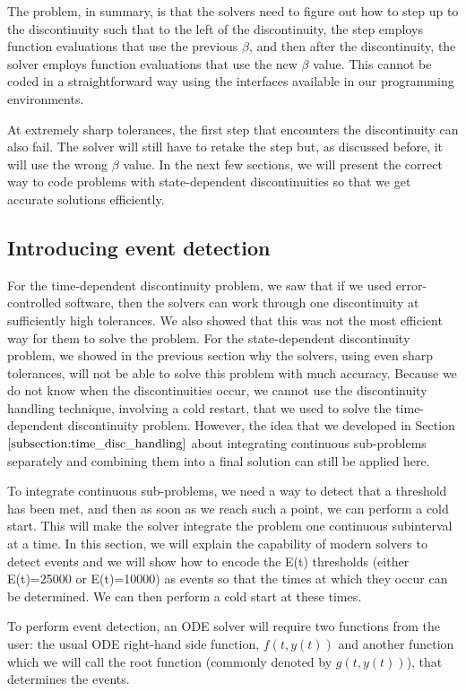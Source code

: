 The problem, in summary, is that the solvers need to figure out how to step up to the discontinuity such that to the left of the discontinuity, the step employs function evaluations that use the previous $\beta$, and then after the discontinuity, the solver employs function evaluations that use the new $\beta$ value. This cannot be coded in a straightforward way using the interfaces available in our programming environments.

At extremely sharp tolerances, the first step that encounters the discontinuity can also fail. The solver will still have to retake the step but, as discussed before, it will use the wrong $\beta$ value. In the next few sections, we will present the correct way to code problems with state-dependent discontinuities so that we get accurate solutions efficiently.

\subsection{Introducing event detection}
\label{subsection:intro_event_detection}
For the time-dependent discontinuity problem, we saw that if we used error-controlled software, then the solvers can work through one discontinuity at sufficiently high tolerances. We also showed that this was not the most efficient way for them to solve the problem. For the state-dependent discontinuity problem, we showed in the previous section why the solvers, using even sharp tolerances, will not be able to solve this problem with much accuracy. Because we do not know when the discontinuities occur, we cannot use the discontinuity handling technique, involving a cold restart, that we used to solve the time-dependent discontinuity problem. However, the idea that we developed in Section $\ref{subsection:time_disc_handling}$ about integrating continuous sub-problems separately and combining them into a final solution can still be applied here. 

To integrate continuous sub-problems, we need a way to detect that a threshold has been met, and then as soon as we reach such a point, we can perform a cold start. This will make the solver integrate the problem one continuous subinterval at a time. In this section, we will explain the capability of modern solvers to detect events and we will show how to encode the E(t) thresholds (either E(t)=25000 or E(t)=10000) as events so that the times at which they occur can be determined. We can then perform a cold start at these times.

To perform event detection, an ODE solver will require two functions from the user: the usual ODE right-hand side function, $f(t, y(t))$ and another function which we will call the root function (commonly denoted by $g(t, y(t))$), that determines the events.

